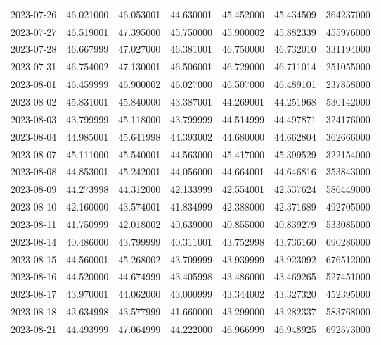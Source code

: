 \begin{tabular}{lrrrrrr}
2023-07-26 &   46.021000 &   46.053001 &   44.630001 &   45.452000 &   45.434509 &   364237000 \\
2023-07-27 &   46.519001 &   47.395000 &   45.750000 &   45.900002 &   45.882339 &   455976000 \\
2023-07-28 &   46.667999 &   47.027000 &   46.381001 &   46.750000 &   46.732010 &   331194000 \\
2023-07-31 &   46.754002 &   47.130001 &   46.506001 &   46.729000 &   46.711014 &   251055000 \\
2023-08-01 &   46.459999 &   46.900002 &   46.027000 &   46.507000 &   46.489101 &   237858000 \\
2023-08-02 &   45.831001 &   45.840000 &   43.387001 &   44.269001 &   44.251968 &   530142000 \\
2023-08-03 &   43.799999 &   45.118000 &   43.799999 &   44.514999 &   44.497871 &   324176000 \\
2023-08-04 &   44.985001 &   45.641998 &   44.393002 &   44.680000 &   44.662804 &   362666000 \\
2023-08-07 &   45.111000 &   45.540001 &   44.563000 &   45.417000 &   45.399529 &   322154000 \\
2023-08-08 &   44.853001 &   45.242001 &   44.056000 &   44.664001 &   44.646816 &   353843000 \\
2023-08-09 &   44.273998 &   44.312000 &   42.133999 &   42.554001 &   42.537624 &   586449000 \\
2023-08-10 &   42.160000 &   43.574001 &   41.834999 &   42.388000 &   42.371689 &   492705000 \\
2023-08-11 &   41.750999 &   42.018002 &   40.639000 &   40.855000 &   40.839279 &   533085000 \\
2023-08-14 &   40.486000 &   43.799999 &   40.311001 &   43.752998 &   43.736160 &   690286000 \\
2023-08-15 &   44.560001 &   45.268002 &   43.709999 &   43.939999 &   43.923092 &   676512000 \\
2023-08-16 &   44.520000 &   44.674999 &   43.405998 &   43.486000 &   43.469265 &   527451000 \\
2023-08-17 &   43.970001 &   44.062000 &   43.000999 &   43.344002 &   43.327320 &   452395000 \\
2023-08-18 &   42.634998 &   43.577999 &   41.660000 &   43.299000 &   43.282337 &   583768000 \\
2023-08-21 &   44.493999 &   47.064999 &   44.222000 &   46.966999 &   46.948925 &   692573000 \\

\end{tabular}
